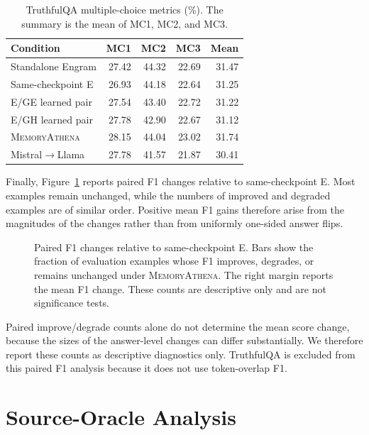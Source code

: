 \begin{table}[h]
\centering
\caption{
TruthfulQA multiple-choice metrics (\%). The summary is the mean of MC1, MC2,
and MC3.
}
\label{tab:truthfulqa-mc}
\small
\begin{tabular}{lrrrr}
\toprule
Condition & MC1 & MC2 & MC3 & Mean\\
\midrule
Standalone Engram & 27.42 & 44.32 & 22.69 & 31.47\\
Same-checkpoint E & 26.93 & 44.18 & 22.64 & 31.25\\
E/GE learned pair & 27.54 & 43.40 & 22.72 & 31.22\\
E/GH learned pair & 27.78 & 42.90 & 22.67 & 31.12\\
\rowcolor{tablefocus}
\textsc{MemoryAthena} & 28.15 & 44.04 & 23.02 & 31.74\\
Mistral$\rightarrow$Llama & 27.78 & 41.57 & 21.87 & 30.41\\
\bottomrule
\end{tabular}
\end{table}

Finally, Figure~\ref{fig:qa-paired} reports paired F1 changes relative to
same-checkpoint E. Most examples remain unchanged, while the numbers of
improved and degraded examples are of similar order. Positive mean F1 gains
therefore arise from the magnitudes of the changes rather than from uniformly
one-sided answer flips.

\begin{figure}[t]
    \centering
    \caption{
    Paired F1 changes relative to same-checkpoint E. Bars show the fraction of
    evaluation examples whose F1 improves, degrades, or remains unchanged under
    \textsc{MemoryAthena}. The right margin reports the mean F1 change.
    These counts are descriptive only and are not significance tests.
    }
    \label{fig:qa-paired}
\end{figure}

Paired improve/degrade counts alone do not determine the mean score change,
because the sizes of the answer-level changes can differ substantially.
We therefore report these counts as descriptive diagnostics only. TruthfulQA is
excluded from this paired F1 analysis because it does not use token-overlap F1.
\section{Source-Oracle Analysis}
\label{app:oracle}

